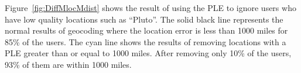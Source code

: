 Figure~\ref{fig:DiffMlocMdist} shows the result of using the PLE to ignore
users who have low quality locations such as ``Pluto''.
The solid black line represents the normal results of geocoding where the
location error is less than 1000 miles for 85\% of the users.
The cyan line shows the results of removing locations with a PLE greater than
or equal to 1000 miles.
After removing only 10\% of the users, 93\% of them are within 1000 miles.
